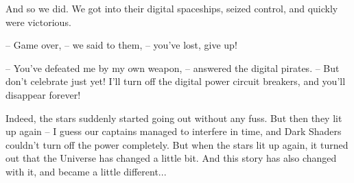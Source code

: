 \documentclass[ebook,oneside,final,openright]{memoir}
\begin{document}
\par
And so we did. We got into their digital spaceships, seized control, and quickly were victorious.\par
– Game over, – we said to them, – you’ve lost, give up!\par
– You’ve defeated me by my own weapon, – answered the digital pirates. – But don’t celebrate just yet! I’ll turn off the digital power circuit breakers, and you’ll disappear forever!\par
\par
Indeed, the stars suddenly started going out without any fuss. But then they lit up again – I guess our captains managed to interfere in time, and Dark Shaders couldn’t turn off the power completely. But when the stars lit up again, it turned out that the Universe has changed a little bit. And this story has also changed with it, and became a little different...\par
\end{document}
